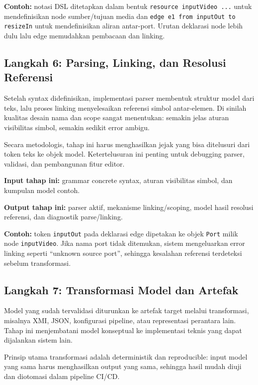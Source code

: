 \textbf{Contoh:} notasi DSL ditetapkan dalam bentuk \texttt{resource inputVideo ...} untuk mendefinisikan node sumber/tujuan media dan \texttt{edge e1 from inputOut to resizeIn} untuk mendefinisikan aliran antar-port. Urutan deklarasi node lebih dulu lalu edge memudahkan pembacaan dan linking.

\subsection[Langkah 6: Parsing, Linking, dan Resolusi]{Langkah 6: Parsing, Linking, dan Resolusi Referensi}

Setelah syntax didefinisikan, implementasi parser membentuk struktur model dari teks, lalu proses linking menyelesaikan referensi simbol antar-elemen. Di sinilah kualitas desain nama dan scope sangat menentukan: semakin jelas aturan visibilitas simbol, semakin sedikit error ambigu.

Secara metodologis, tahap ini harus menghasilkan jejak yang bisa ditelusuri dari token teks ke objek model. Ketertelusuran ini penting untuk debugging parser, validasi, dan pembangunan fitur editor.

\textbf{Input tahap ini:} grammar concrete syntax, aturan visibilitas simbol, dan kumpulan model contoh.

\textbf{Output tahap ini:} parser aktif, mekanisme linking/scoping, model hasil resolusi referensi, dan diagnostik parse/linking.

\textbf{Contoh:} token \texttt{inputOut} pada deklarasi edge dipetakan ke objek \texttt{Port} milik node \texttt{inputVideo}. Jika nama port tidak ditemukan, sistem mengeluarkan error linking seperti ``unknown source port'', sehingga kesalahan referensi terdeteksi sebelum transformasi.

\subsection{Langkah 7: Transformasi Model dan Artefak}

Model yang sudah tervalidasi diturunkan ke artefak target melalui transformasi, misalnya XMI, JSON, konfigurasi pipeline, atau representasi perantara lain. Tahap ini menjembatani model konseptual ke implementasi teknis yang dapat dijalankan sistem lain.

Prinsip utama transformasi adalah deterministik dan reproducible: input model yang sama harus menghasilkan output yang sama, sehingga hasil mudah diuji dan diotomasi dalam pipeline CI/CD.

